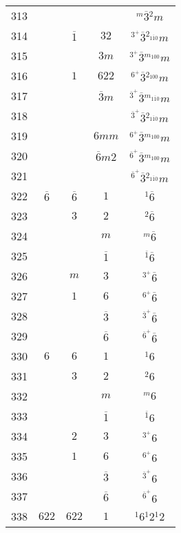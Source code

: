 \begin{longtable}{ccccc}
  313 &  &  &  & ${}^{m} \overline{3} {}^{2} m $\\
  314 &  & $\overline{1}$ & $32$ & ${}^{3^{+}} \overline{3} {}^{2_{1\overline{1}0}} m $\\
  315 &  &  & $3m$ & ${}^{3^{+}} \overline{3} {}^{m_{100}} m $\\
  316 &  & $1$ & $622$ & ${}^{6^{+}} \overline{3} {}^{2_{100}} m $\\
  317 &  &  & $\overline{3}m$ & ${}^{\overline{3}^{+}} \overline{3} {}^{m_{1\overline{1}0}} m $\\
  318 &  &  &  & ${}^{\overline{3}^{+}} \overline{3} {}^{2_{1\overline{1}0}} m $\\
  319 &  &  & $6mm$ & ${}^{6^{+}} \overline{3} {}^{m_{100}} m $\\
  320 &  &  & $\overline{6}m2$ & ${}^{\overline{6}^{+}} \overline{3} {}^{m_{100}} m $\\
  321 &  &  &  & ${}^{\overline{6}^{+}} \overline{3} {}^{2_{1\overline{1}0}} m $\\
  322 & $\overline{6}$ & $\overline{6}$ & $1$ & ${}^{1} \overline{6} $\\
  323 &  & $3$ & $2$ & ${}^{2} \overline{6} $\\
  324 &  &  & $m$ & ${}^{m} \overline{6} $\\
  325 &  &  & $\overline{1}$ & ${}^{\overline{1}} \overline{6} $\\
  326 &  & $m$ & $3$ & ${}^{3^{+}} \overline{6} $\\
  327 &  & $1$ & $6$ & ${}^{6^{+}} \overline{6} $\\
  328 &  &  & $\overline{3}$ & ${}^{\overline{3}^{+}} \overline{6} $\\
  329 &  &  & $\overline{6}$ & ${}^{\overline{6}^{+}} \overline{6} $\\
  330 & $6$ & $6$ & $1$ & ${}^{1} 6 $\\
  331 &  & $3$ & $2$ & ${}^{2} 6 $\\
  332 &  &  & $m$ & ${}^{m} 6 $\\
  333 &  &  & $\overline{1}$ & ${}^{\overline{1}} 6 $\\
  334 &  & $2$ & $3$ & ${}^{3^{+}} 6 $\\
  335 &  & $1$ & $6$ & ${}^{6^{+}} 6 $\\
  336 &  &  & $\overline{3}$ & ${}^{\overline{3}^{+}} 6 $\\
  337 &  &  & $\overline{6}$ & ${}^{\overline{6}^{+}} 6 $\\
  338 & $622$ & $622$ & $1$ & ${}^{1} 6 {}^{1} 2 {}^{1} 2 $\\

\end{longtable}
